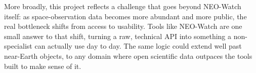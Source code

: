 \vspace{0.25cm}

More broadly, this project reflects a challenge that goes beyond NEO-Watch itself: as space-observation data becomes more abundant and more public, the real bottleneck shifts from access to usability. Tools like NEO-Watch are one small answer to that shift, turning a raw, technical API into something a non-specialist can actually use day to day. The same logic could extend well past near-Earth objects, to any domain where open scientific data outpaces the tools built to make sense of it.
